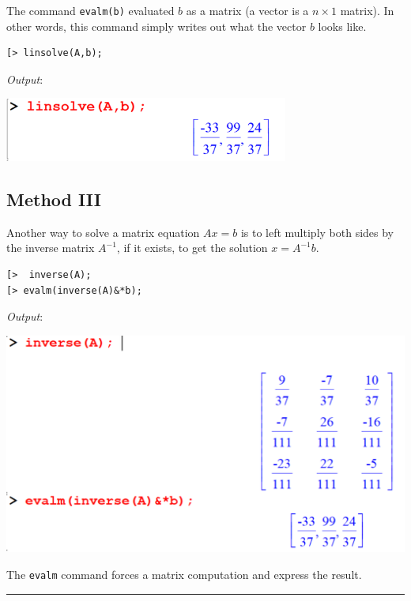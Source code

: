 \documentclass[
]{book}
\theoremstyle{definition}
\theoremstyle{definition}
\theoremstyle{definition}
\theoremstyle{definition}
\theoremstyle{remark}
\begin{document}
The command \texttt{evalm(b)} evaluated \(b\) as a matrix (a vector is a \(n \times 1\) matrix).
In other words, this command simply writes out what the vector \(b\) looks like.

\begin{verbatim}
[> linsolve(A,b);
\end{verbatim}

\emph{Output}:

\includegraphics[width=0.7\textwidth,height=\textheight]{figures/Lesson 5/fig7.png}

\subsection{Method III}\label{method-iii}

Another way to solve a matrix equation \(Ax = b\) is to left multiply both sides by the inverse matrix \(A^{-1}\), if it exists, to get the solution \(x = A^{-1}b\).

\begin{verbatim}
[>  inverse(A);
[> evalm(inverse(A)&*b);
\end{verbatim}

\emph{Output}:

\includegraphics{figures/Lesson 5/fig8.png}

The \texttt{evalm} command forces a matrix computation and express the result.

\begin{center}\rule{0.5\linewidth}{0.5pt}\end{center}
\end{document}
